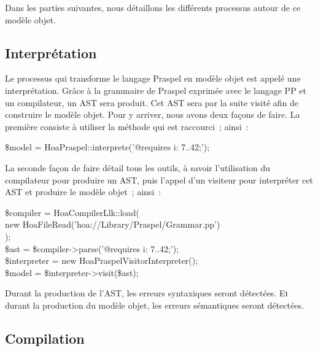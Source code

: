 Dans les parties suivantes, nous détaillons les différents processus autour de
ce modèle objet.

\subsection{Interprétation}
\label{subsection:tools:interpretation}

Le processus qui transforme le langage Praspel en modèle objet est appelé une
interprétation. Grâce à la grammaire de Praspel exprimée avec le langage PP et
un compilateur, un AST sera produit. Cet AST sera par la suite visité afin de
construire le modèle objet. Pour y arriver, nous avons deux façons de faire. La
première consiste à utiliser la méthode 
qui est raccourci~; ainsi~:
%
\begin{pre}
\$model = Hoa\bslash{}Praspel::interprete('@requires i: 7..42;');
\end{pre}
%
La seconde façon de faire détail tous les outils, à savoir l'utilisation du
compilateur pour produire un AST, puis l'appel d'un visiteur pour interpréter
cet AST et produire le modèle objet~; ainsi~:
%
\begin{pre}
\$compiler    = Hoa\bslash{}Compiler\bslash{}Llk::load( \\
    new Hoa\bslash{}File\bslash{}Read('hoa://Library/Praspel/Grammar.pp') \\
); \\
\$ast         = \$compiler->parse('@requires i: 7..42;'); \\
\$interpreter = new Hoa\bslash{}Praspel\bslash{}Visitor\bslash{}Interpreter(); \\
\$model       = \$interpreter->visit(\$ast);
\end{pre}

Durant la production de l'AST, les erreurs syntaxiques seront détectées. Et
durant la production du modèle objet, les erreurs sémantiques seront détectées.

\subsection{Compilation}
\label{subsection:tools:compilation}

